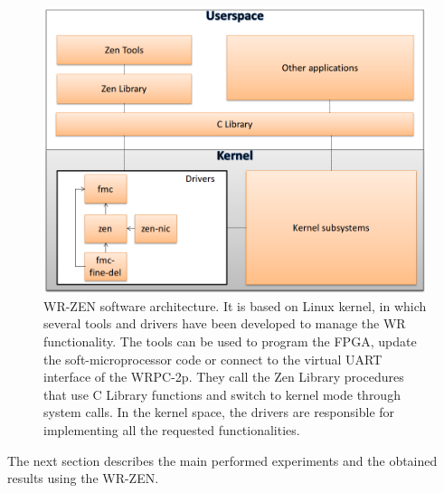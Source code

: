 \begin{figure}[H] \centering
	\includegraphics[scale=0.4]{img/software_architecture}
	\caption{WR-ZEN software
	architecture. It is based on Linux kernel, in which
	several tools and drivers have been developed to manage the WR functionality. The
	tools can be used to program the FPGA, update the soft-microprocessor
	code or connect to the virtual UART interface of the WRPC-2p. They call
	the Zen Library procedures that use C Library functions and
	switch to kernel mode through system calls. In the kernel space, the
	drivers are responsible for implementing all the requested functionalities. }
	\label{fig:software_architecture} 
\end{figure}

The next section describes the main performed experiments and the obtained
results using the WR-ZEN.

